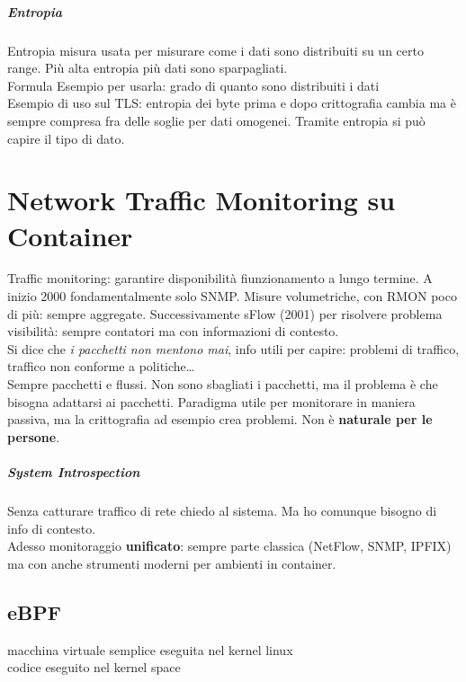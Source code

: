 \documentclass[10pt]{book}
\begin{document}
\paragraph{Entropia} Entropia misura usata per misurare come i dati sono distribuiti su un certo range. Più alta entropia più dati sono sparpagliati.\\
Formula %
Esempio per usarla: grado di quanto sono distribuiti i dati\\
Esempio di uso sul TLS: entropia dei byte prima e dopo crittografia cambia ma è sempre compresa fra delle soglie per dati omogenei. Tramite entropia si può capire il tipo di dato.
\chapter{Network Traffic Monitoring su Container}
Traffic monitoring: garantire disponibilità fiunzionamento a lungo termine. A inizio 2000 fondamentalmente solo SNMP. Misure volumetriche, con RMON poco di più: sempre aggregate. Successivamente sFlow (2001) per risolvere problema visibilità: sempre contatori ma con informazioni di contesto.\\
Si dice che \textit{i pacchetti non mentono mai}, info utili per capire: problemi di traffico, traffico non conforme a politiche\ldots\\
Sempre pacchetti e flussi. Non sono sbagliati i pacchetti, ma il problema è che bisogna adattarsi ai pacchetti. Paradigma utile per monitorare in maniera passiva, ma la crittografia ad esempio crea problemi. Non è \textbf{naturale per le persone}.
\paragraph{System Introspection} Senza catturare traffico di rete chiedo al sistema. Ma ho comunque bisogno di info di contesto.\\
Adesso monitoraggio \textbf{unificato}: sempre parte classica (NetFlow, SNMP, IPFIX) ma con anche strumenti moderni per ambienti in container.
\section{eBPF}
macchina virtuale semplice eseguita nel kernel linux\\
codice eseguito nel kernel space
\end{document}
